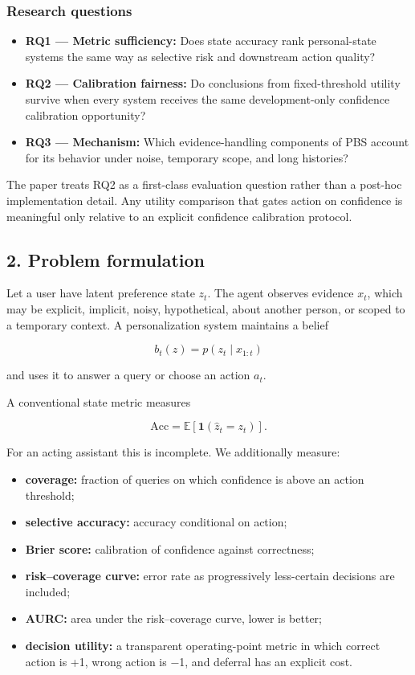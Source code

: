 \documentclass[
  10pt,
  letterpaper,
]{article}
\providecommand{\tightlist}{%
  \setlength{\itemsep}{0pt}\setlength{\parskip}{0pt}}
\begin{document}
\subsubsection{Research questions}\label{research-questions}

\begin{itemize}
\tightlist
\item
  \textbf{RQ1 --- Metric sufficiency:} Does state accuracy rank
  personal-state systems the same way as selective risk and downstream
  action quality?
\item
  \textbf{RQ2 --- Calibration fairness:} Do conclusions from
  fixed-threshold utility survive when every system receives the same
  development-only confidence calibration opportunity?
\item
  \textbf{RQ3 --- Mechanism:} Which evidence-handling components of PBS
  account for its behavior under noise, temporary scope, and long
  histories?
\end{itemize}

The paper treats RQ2 as a first-class evaluation question rather than a
post-hoc implementation detail. Any utility comparison that gates action
on confidence is meaningful only relative to an explicit confidence
calibration protocol.

\subsection{2. Problem formulation}\label{problem-formulation}

Let a user have latent preference state \(z_t\). The agent observes
evidence \(x_t\), which may be explicit, implicit, noisy, hypothetical,
about another person, or scoped to a temporary context. A
personalization system maintains a belief

\[
b_t(z)=p(z_t\mid x_{1:t})
\]

and uses it to answer a query or choose an action \(a_t\).

A conventional state metric measures

\[
\mathrm{Acc}=\mathbb{E}[\mathbf{1}(\hat z_t=z_t)].
\]

For an acting assistant this is incomplete. We additionally measure:

\begin{itemize}
\tightlist
\item
  \textbf{coverage:} fraction of queries on which confidence is above an
  action threshold;
\item
  \textbf{selective accuracy:} accuracy conditional on action;
\item
  \textbf{Brier score:} calibration of confidence against correctness;
\item
  \textbf{risk--coverage curve:} error rate as progressively
  less-certain decisions are included;
\item
  \textbf{AURC:} area under the risk--coverage curve, lower is better;
\item
  \textbf{decision utility:} a transparent operating-point metric in
  which correct action is +1, wrong action is −1, and deferral has an
  explicit cost.
\end{itemize}
\end{document}
